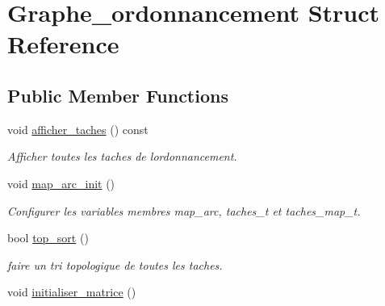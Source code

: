 \hypertarget{structGraphe__ordonnancement}{}\section{Graphe\+\_\+ordonnancement Struct Reference}
\label{structGraphe__ordonnancement}
\subsection*{Public Member Functions}
\begin{DoxyCompactItemize}
\item 
void \hyperlink{structGraphe__ordonnancement_a6707dbf1e9b59f2218b9d38f913daaec}{afficher\+\_\+taches} () const \hypertarget{structGraphe__ordonnancement_a6707dbf1e9b59f2218b9d38f913daaec}{}\label{structGraphe__ordonnancement_a6707dbf1e9b59f2218b9d38f913daaec}

\begin{DoxyCompactList}\small\item\em Afficher toutes les taches de l\textquotesingle{}ordonnancement. \end{DoxyCompactList}\item 
void \hyperlink{structGraphe__ordonnancement_acbfe756098829425ab73e786b3e9980c}{map\+\_\+arc\+\_\+init} ()\hypertarget{structGraphe__ordonnancement_acbfe756098829425ab73e786b3e9980c}{}\label{structGraphe__ordonnancement_acbfe756098829425ab73e786b3e9980c}

\begin{DoxyCompactList}\small\item\em Configurer les variables membres map\+\_\+arc, taches\+\_\+t et taches\+\_\+map\+\_\+t. \end{DoxyCompactList}\item 
bool \hyperlink{structGraphe__ordonnancement_af2662be9ddd82e173a4c82977a032004}{top\+\_\+sort} ()
\begin{DoxyCompactList}\small\item\em faire un tri topologique de toutes les taches. \end{DoxyCompactList}\item 
void \hyperlink{structGraphe__ordonnancement_afba2fe9491a6f749357db158d7b30694}{initialiser\+\_\+matrice} ()\hypertarget{structGraphe__ordonnancement_afba2fe9491a6f749357db158d7b30694}{}\label{structGraphe__ordonnancement_afba2fe9491a6f749357db158d7b30694}


\end{DoxyCompactItemize}
